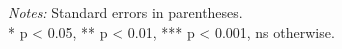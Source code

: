 \begin{flushleft}
    \small
    \textit{Notes:} Standard errors in parentheses. \\
    * p < 0.05, ** p < 0.01, *** p < 0.001, ns otherwise.
\end{flushleft}

